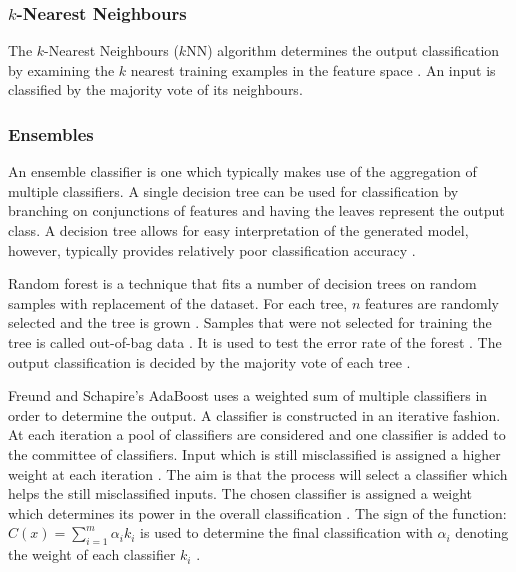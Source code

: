\documentclass{sig-alternate-05-2015}
\begin{document}
	\subsubsection{$k$-Nearest Neighbours}
	The $k$-Nearest Neighbours ($k$NN) algorithm determines the output classification by examining the $k$ nearest training examples in the feature space \cite{6313426}. An input is classified by the majority vote of its neighbours.
	
	\subsubsection{Ensembles}
	An ensemble classifier is one which typically makes use of the aggregation of multiple classifiers. A single decision tree can be used for classification by branching on conjunctions of features and having the leaves represent the output class. A decision tree allows for easy interpretation of the generated model, however, typically provides relatively poor classification accuracy \cite{doi:10.1021/ci034160g}. 
	
	Random forest is a technique that fits a number of decision trees on random samples with replacement of the dataset. For each tree, $n$ features are randomly selected and the tree is grown \cite{WIDM:WIDM1072}. Samples that were not selected for training the tree is called out-of-bag data \cite{WIDM:WIDM1072}. It is used to test the error rate of the forest \cite{WIDM:WIDM1072, doi:10.1021/ci034160g}. The output classification is decided by the majority vote of each tree \cite{WIDM:WIDM1072}.
	
	Freund and Schapire's \cite{FREUND1997119} AdaBoost uses a weighted sum of multiple classifiers in order to determine the output. A classifier is constructed in an iterative fashion. At each iteration a pool of classifiers are considered and one classifier is added to the committee of classifiers. Input which is still misclassified is assigned a higher weight at each iteration \cite{Bergstra2006, rojas2009adaboost}. The aim is that the process will select a classifier which helps the still misclassified inputs. The chosen classifier is assigned a weight which determines its power in the overall classification \cite{Bergstra2006, rojas2009adaboost}. The sign of the function: $C(x) = \sum_{i=1}^{m} \alpha_i k_i$ is used to determine the final classification with $\alpha_i$ denoting the weight of each classifier $k_i$ \cite{Bergstra2006}. 
	
\end{document}

